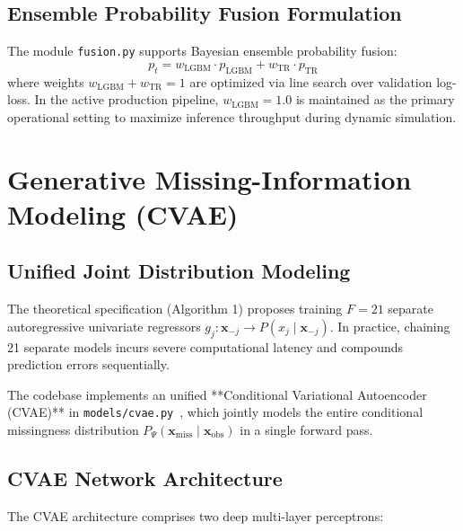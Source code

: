 \documentclass[11pt,a4paper]{report}
\begin{document}
\section{Ensemble Probability Fusion Formulation}
The module \texttt{fusion.py} supports Bayesian ensemble probability fusion:
\begin{equation}
  p_t = w_{\text{LGBM}} \cdot p_{\text{LGBM}} + w_{\text{TR}} \cdot p_{\text{TR}}
\end{equation}
where weights $w_{\text{LGBM}} + w_{\text{TR}} = 1$ are optimized via line search over validation log-loss. In the active production pipeline, $w_{\text{LGBM}} = 1.0$ is maintained as the primary operational setting to maximize inference throughput during dynamic simulation.

\chapter{Generative Missing-Information Modeling (CVAE)}

\section{Unified Joint Distribution Modeling}
The theoretical specification (Algorithm 1) proposes training $F=21$ separate autoregressive univariate regressors $g_j: \mathbf{x}_{-j} \to P(x_j \mid \mathbf{x}_{-j})$. In practice, chaining 21 separate models incurs severe computational latency and compounds prediction errors sequentially.

The codebase implements an unified **Conditional Variational Autoencoder (CVAE)** in \texttt{models/cvae.py}~\cite{sohn2015learning}, which jointly models the entire conditional missingness distribution $P_\Psi(\mathbf{x}_{\text{miss}} \mid \mathbf{x}_{\text{obs}})$ in a single forward pass.

\section{CVAE Network Architecture}
The CVAE architecture comprises two deep multi-layer perceptrons:
\end{document}
